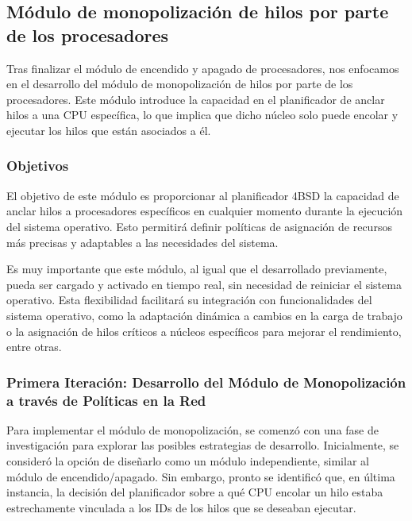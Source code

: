 \subsection{Módulo de monopolización de hilos por parte de los procesadores}

Tras finalizar el módulo de encendido y apagado de procesadores, nos enfocamos en el desarrollo del módulo de monopolización de hilos por parte de los procesadores. Este módulo introduce la capacidad en el planificador de anclar hilos a una CPU específica, lo que implica que dicho núcleo solo puede encolar y ejecutar los hilos que están asociados a él.\par

\subsubsection{Objetivos}

El objetivo de este módulo es proporcionar al planificador 4BSD la capacidad de anclar hilos a procesadores específicos en cualquier momento durante la ejecución del sistema operativo. Esto permitirá definir políticas de asignación de recursos más precisas y adaptables a las necesidades del sistema.\par

Es muy importante que este módulo, al igual que el desarrollado previamente, pueda ser cargado y activado en tiempo real, sin necesidad de reiniciar el sistema operativo. Esta flexibilidad facilitará su integración con funcionalidades del sistema operativo, como la adaptación dinámica a cambios en la carga de trabajo o la asignación de hilos críticos a núcleos específicos para mejorar el rendimiento, entre otras.\par

\subsubsection{Primera Iteración: Desarrollo del Módulo de Monopolización a través de Políticas en la Red}

Para implementar el módulo de monopolización, se comenzó con una fase de investigación para explorar las posibles estrategias de desarrollo. Inicialmente, se consideró la opción de diseñarlo como un módulo independiente, similar al módulo de encendido/apagado. Sin embargo, pronto se identificó que, en última instancia, la decisión del planificador sobre a qué CPU encolar un hilo estaba estrechamente vinculada a los IDs de los hilos que se deseaban ejecutar.

